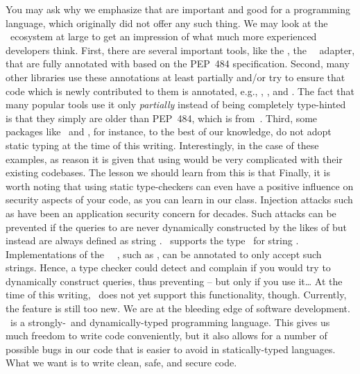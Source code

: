 You may ask why we emphasize that  are important and good for a programming language, which originally did not offer any such thing.
We may look at the \python\ ecosystem at large to get an impression of what much more experienced developers think.
First, there are several important tools, like the \psycopg{}, the \postgresql\ \python\ adapter, that are fully annotated with  based on the PEP~484 specification.
Second, many other libraries use these annotations at least partially and/or try to ensure that code which is newly contributed to them is annotated, e.g., \matplotlib{}, \numpy{}, and \pandas{}.
The fact that many popular tools use it only \emph{partially} instead of being completely type-hinted is that they simply are older than PEP~484, which is from~\citeyear{PEP484}.
Third, some packages like \scikitlearn\ and \scipy, for instance, to the best of our knowledge, do not adopt static typing at the time of this writing.
Interestingly, in the case of these examples, as reason it is given that using  would be very complicated with their existing codebases.
The lesson we should learn from this is that%
%
%
%
Finally, it is worth noting that using static type-checkers can even have a positive influence on security aspects of your code, as you can learn in our  class.
Injection attacks such as  have been an application security concern for decades.
Such attacks can be prevented if the queries to  are never dynamically constructed by the likes of  but instead are always defined as string .
\python\ supports the type~ for string .
Implementations of the \python\ \db\ , such as \psycopg{}, can be annotated to only accept such strings.
Hence, a type checker could detect and complain if you would try to dynamically construct queries, thus preventing  -- but only if you use it\dots
At the time of this writing, \mypy\ does not yet support this functionality, though.
Currently, the feature is still too new.
We are at the bleeding edge of software development.%
%
\FloatBarrier%
\endhsection%
%
%
\python\ is a strongly-\ and dynamically-typed programming language.
This gives us much freedom to write code conveniently, but it also allows for a number of possible bugs in our code that is easier to avoid in statically-typed languages.
What we want is to write clean, safe, and secure code.

